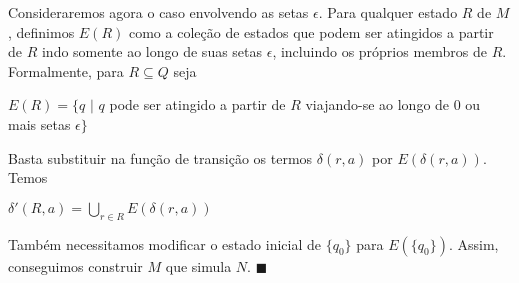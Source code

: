 \documentclass[12pt,a4paper,oneside]{article}
\begin{document}
Consideraremos agora o caso envolvendo as setas $\epsilon$. Para qualquer estado $R$ de $M$, definimos $E(R)$ como a coleção de estados que podem ser atingidos a partir de $R$ indo somente ao longo de suas setas $\epsilon$, incluindo os próprios membros de $R$. Formalmente, para $R \subseteq Q$ seja
	\begin{center}
		$E(R) = \{q \mbox{ | } q$ pode ser atingido a partir de $R$ viajando-se ao longo de 0 ou mais setas $\epsilon \}$	
	\end{center}	
	Basta substituir na função de transição os termos $\delta(r,a)$ por $E(\delta(r,a))$. Temos
			\begin{center}
				$\delta'(R,a) = \bigcup\limits_{r \in R} E(\delta (r,a))$
			\end{center}
Também necessitamos modificar o estado inicial de $\{ q_0 \}$ para $E(\{ q_0 \})$. Assim, conseguimos construir $M$ que simula $N$. $\blacksquare$
\end{document}
